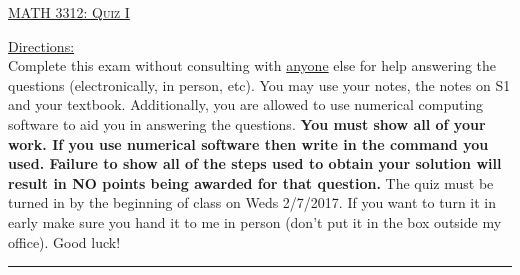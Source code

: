 \documentclass[10pt, a4paper]{article}
\theoremstyle{break}
\begin{document}
\begin{center}
{\large \textsc{\underline{MATH 3312: Quiz I}}}
\vspace{0.125in}
\end{center}
\underline{Directions:} \\
Complete this exam without consulting with \underline{anyone} else for help answering the questions (electronically, in person, etc). You may use your notes, the notes on S1 and your textbook. Additionally, you are allowed to use numerical computing software to aid you in answering the questions. \textbf{You must show all of your work. If you use numerical software then write in the command you used. Failure to show all of the steps used to obtain your solution will result in NO points being awarded for that question. } 
\noindent The quiz must be turned in by the beginning of class on Weds 2/7/2017. If you want to turn it in early make sure you hand it to me in person (don't put it in the box outside my office). Good luck! \\
\noindent\rule{15cm}{0.4pt}

\vspace{0.25in}
\end{document}
